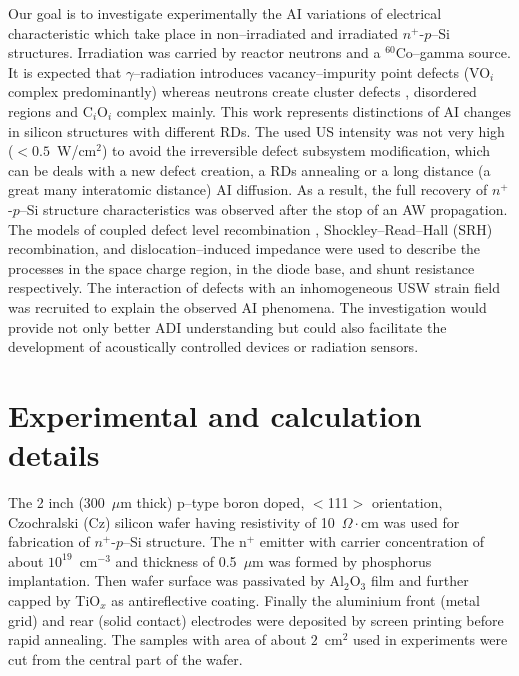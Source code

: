 \documentclass[aip,jap,reprint]{revtex4-1}
\begin{document}
Our goal is to investigate experimentally the AI variations of electrical characteristic which take place in non--irradiated and irradiated $n^+$-$p$--Si structures.
Irradiation was carried by reactor neutrons and a $^{60}$Co--gamma source.
It is expected that $\gamma$--radiation introduces vacancy--impurity point defects (VO$_i$ complex predominantly) \cite{NIEL:Jafari,Gamma:Prabhakara,NIEL:Moll}
whereas neutrons create cluster defects \cite{Rew:Srour,Pintilie}, disordered regions \cite{Neutron:Arutyunov} and C$_i$O$_i$ complex  \cite{NIEL:Moll,neutron:Londos} mainly.
This work represents distinctions of AI changes in silicon structures with different RDs.
The used US intensity was not very high ($<0.5$~W/cm$^2$) to avoid the irreversible defect subsystem modification, which can be deals with a new defect creation, a RDs annealing or a long distance (a great many interatomic distance) AI diffusion.
As a result, the full recovery of $n^+$-$p$--Si structure characteristics was observed after the stop of an AW propagation.
The models of coupled defect level recombination \cite{CDLR:JAP1995,CDLR:JAP}, Shockley--Read--Hall (SRH) recombination, and dislocation--induced impedance \cite{Rsh:Gopal2003,Rsh:Gopal2004} were used to describe the processes in the space charge region,  in the diode base, and shunt resistance respectively.
The interaction of defects with an inhomogeneous USW strain field \cite{MirzadeJAP2011,PeleshchakUJF2016} was recruited to explain the observed AI phenomena.
The investigation would provide not only better ADI understanding but could also facilitate the development of acoustically controlled devices or radiation sensors.



\section{Experimental and calculation details}

The 2 inch (300~$\mu$m thick) p--type boron doped, $<$111$>$ orientation, Czochralski (Cz) silicon wafer having resistivity of 10~$\Omega\cdot$cm was used for fabrication of  $n^+$-$p$--Si structure.
The n$^+$ emitter with carrier concentration of about $10^{19}$~cm$^{-3}$ and thickness of 0.5~$\mu$m was formed by phosphorus implantation.
Then wafer surface was passivated by Al$_2$O$_3$ film and further capped by TiO$_x$ as antireflective coating.
Finally the aluminium front (metal grid) and rear (solid contact) electrodes were deposited by screen printing before rapid annealing.
The samples with area of about $2$~cm$^{2}$ used in experiments were cut from the central part of the wafer.
\end{document}
